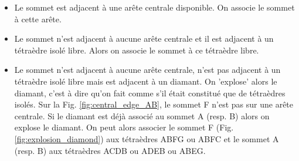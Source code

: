 \begin{itemize}
\item Le sommet est adjacent à une arête centrale disponible. On associe le sommet à cette arête.
\item Le sommet n'est adjacent à aucune arête centrale et il est adjacent à un tétraèdre isolé libre. Alors on associe le sommet à ce tétraèdre libre.
\item Le sommet n'est adjacent à aucune arête centrale, n'est pas adjacent à un tétraèdre isolé libre mais est adjacent à un diamant. On 'explose' alors le diamant, c'est à dire qu'on fait comme s'il était constitué que de tétraèdres isolés. Sur la Fig. \ref{fig:central_edge_AB}, le sommet F n'est pas sur une arête centrale. Si le diamant est déjà associé au sommet A (resp. B) alors on explose le diamant. On peut alors associer le sommet F (Fig. \ref{fig:explosion_diamond}) aux tétraèdres ABFG ou ABFC et le sommet A (resp. B) aux tétraèdres ACDB ou ADEB ou ABEG.\\
\end{itemize}

